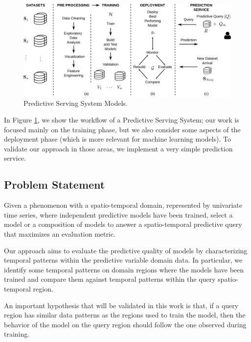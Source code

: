 \begin{figure}[h]
	\centering
	\includegraphics[scale=0.31]{../Figures/ModelManagementPS-VersionCompleta}
	\caption{Predictive Serving System Models.}
	\label{Fig:MotiPoster}
\end{figure}

In Figure \ref{Fig:MotiPoster}, we show the workflow of a Predictive Serving System; our work is focused mainly on the training phase, but we also consider some aspects of the deployment phase (which is more relevant for machine learning models). To validate our approach in those areas, we implement a very simple prediction service.


\subsection{Problem Statement}
\label{Sec:ProblemStatement}

Given a phenomenon with a spatio-temporal domain, represented by univariate time series, where independent predictive models have been trained, select a model or a composition of models to answer a spatio-temporal predictive query that maximizes an evaluation metric.

Our approach aims to evaluate the predictive quality of models by characterizing temporal patterns within the predictive variable domain data. In particular, we identify some temporal patterns on domain regions where the models have been trained and compare them against temporal patterns within the query spatio-temporal region. 

An important hypothesis that will be validated in this work is that, if a query region has similar data patterns as the regions used to train the model, then the behavior of the model on the query region should follow the one observed during training.

